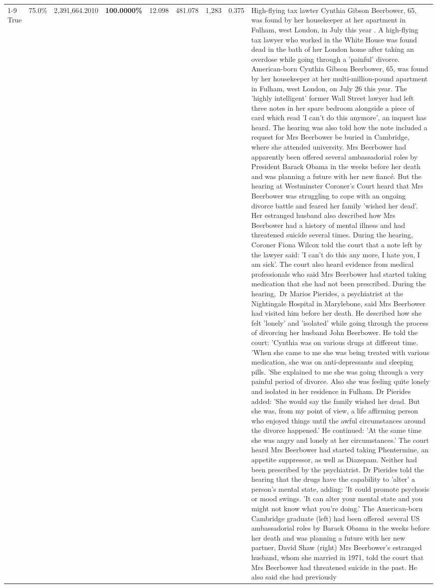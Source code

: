 \begin{table}[H]
\begin{tabular}{lllrlllll}
\cline{1-9}
True & 75.0\% & 2,391,664.2010 & \bfseries \color{red} 100.0000\% & 12.098 & 481.078 & 1,283 & 0.375 & High-flying tax lawter Cynthia Gibson Beerbower, 65, was found by her housekeeper at her apartment in Fulham, west London, in July this year . A high-flying tax lawyer who worked in the White House was found dead in the bath of her London home after taking an overdose while going through a 'painful' divorce. American-born Cynthia Gibson Beerbower, 65, was found by her housekeeper at her multi-million-pound apartment in Fulham, west London, on July 26 this year. The 'highly intelligent' former Wall Street lawyer had left three notes in her spare bedroom alongside a piece of card which read 'I can't do this anymore', an inquest has heard. The hearing was also told how the note included a request for Mrs Beerbower be buried in Cambridge, where she attended university. Mrs Beerbower had apparently been offered several ambassadorial roles by President Barack Obama in the weeks before her death and was planning a future with her new fiancé. But the hearing at Westminster Coroner's Court heard that Mrs Beerbower was struggling to cope with an ongoing divorce battle and feared her family 'wished her dead'. Her estranged husband also described how Mrs Beerbower had a history of mental illness and had threatened suicide several times. During the hearing, Coroner Fiona Wilcox told the court that a note left by the lawyer said: 'I can't do this any more, I hate you, I am sick'. The court also heard evidence from medical professionals who said Mrs Beerbower had started taking medication that she had not been prescribed. During the hearing, Dr Marios Pierides, a psychiatrist at the Nightingale Hospital in Marylebone, said Mrs Beerbower had visited him before her death. He described how she felt 'lonely' and 'isolated' while going through the process of divorcing her husband John Beerbower. He told the court: 'Cynthia was on various drugs at different time. 'When she came to me she was being treated with various medication, she was on anti-depressants and sleeping pills. 'She explained to me she was going through a very painful period of divorce. Also she was feeling quite lonely and isolated in her residence in Fulham. Dr Pierides added: 'She would say the family wished her dead. But she was, from my point of view, a life affirming person who enjoyed things until the awful circumstances around the divorce happened.' He continued: 'At the same time she was angry and lonely at her circumstances.' The court heard Mrs Beerbower had started taking Phentermine, an appetite suppressor, as well as Diazepam. Neither had been prescribed by the psychiatrist. Dr Pierides told the hearing that the drugs have the capability to 'alter' a person's mental state, adding: 'It could promote psychosis or mood swings. 'It can alter your mental state and you might not know what you're doing.' The American-born Cambridge graduate (left) had been offered several US ambassadorial roles by Barack Obama in the weeks before her death and was planning a future with her new partner, David Shaw (right) Mrs Beerbower's estranged husband, whom she married in 1971, told the court that Mrs Beerbower had threatened suicide in the past. He also said she had previously 
\end{tabular}
\end{table}
